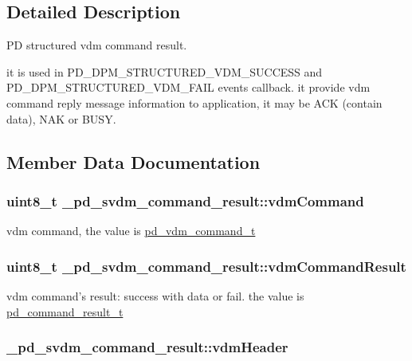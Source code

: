 \subsection{Detailed Description}
P\-D structured vdm command result. 

it is used in P\-D\-\_\-\-D\-P\-M\-\_\-\-S\-T\-R\-U\-C\-T\-U\-R\-E\-D\-\_\-\-V\-D\-M\-\_\-\-S\-U\-C\-C\-E\-S\-S and P\-D\-\_\-\-D\-P\-M\-\_\-\-S\-T\-R\-U\-C\-T\-U\-R\-E\-D\-\_\-\-V\-D\-M\-\_\-\-F\-A\-I\-L events callback. it provide vdm command reply message information to application, it may be A\-C\-K (contain data), N\-A\-K or B\-U\-S\-Y. 

\subsection{Member Data Documentation}
\hypertarget{struct__pd__svdm__command__result_af1f46eb3cd5009b29a5f3ba293a5fc84}{
\subsubsection[{vdm\-Command}]{\setlength{\rightskip}{0pt plus 5cm}uint8\-\_\-t \-\_\-pd\-\_\-svdm\-\_\-command\-\_\-result\-::vdm\-Command}}\label{struct__pd__svdm__command__result_af1f46eb3cd5009b29a5f3ba293a5fc84}
vdm command, the value is \hyperlink{group__usb__pd__stack_gabd6b0763d01e2d65501af70e4f67b039}{pd\-\_\-vdm\-\_\-command\-\_\-t} \hypertarget{struct__pd__svdm__command__result_af52b0485285dda6a8eda1154989dc84e}{
\subsubsection[{vdm\-Command\-Result}]{\setlength{\rightskip}{0pt plus 5cm}uint8\-\_\-t \-\_\-pd\-\_\-svdm\-\_\-command\-\_\-result\-::vdm\-Command\-Result}}\label{struct__pd__svdm__command__result_af52b0485285dda6a8eda1154989dc84e}
vdm command's result\-: success with data or fail. the value is \hyperlink{group__usb__pd__stack_ga59917b1485caba4dd8d9b65ca5a5fd92}{pd\-\_\-command\-\_\-result\-\_\-t} \hypertarget{struct__pd__svdm__command__result_adc6934994780581eba3edc5b4fe47765}{
\subsubsection[{vdm\-Header}]{ \-\_\-pd\-\_\-svdm\-\_\-command\-\_\-result\-::vdm\-Header}}\label{struct__pd__svdm__command__result_adc6934994780581eba3edc5b4fe47765}
